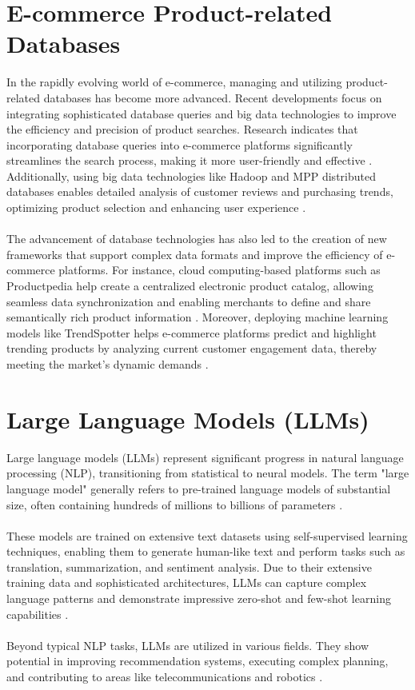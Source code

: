 \section{E-commerce Product-related Databases}
In the rapidly evolving world of e-commerce, managing and utilizing product-related databases has become more advanced. Recent developments focus on integrating sophisticated database queries and big data technologies to improve the efficiency and precision of product searches. Research indicates that incorporating database queries into e-commerce platforms significantly streamlines the search process, making it more user-friendly and effective \cite{Muntjir2016}. Additionally, using big data technologies like Hadoop and MPP distributed databases enables detailed analysis of customer reviews and purchasing trends, optimizing product selection and enhancing user experience \cite{Liang_2020}.
\\\\
The advancement of database technologies has also led to the creation of new frameworks that support complex data formats and improve the efficiency of e-commerce platforms. For instance, cloud computing-based platforms such as Productpedia help create a centralized electronic product catalog, allowing seamless data synchronization and enabling merchants to define and share semantically rich product information \cite{10.1007/978-3-319-20895-4_34}. Moreover, deploying machine learning models like TrendSpotter helps e-commerce platforms predict and highlight trending products by analyzing current customer engagement data, thereby meeting the market's dynamic demands \cite{10.1145/3583780.3615503}.

\section{Large Language Models (LLMs)} %
Large language models (LLMs) represent significant progress in natural language processing (NLP), transitioning from statistical to neural models. The term "large language model" generally refers to pre-trained language models of substantial size, often containing hundreds of millions to billions of parameters \cite{zhao2023survey}.
\\\\
These models are trained on extensive text datasets using self-supervised learning techniques, enabling them to generate human-like text and perform tasks such as translation, summarization, and sentiment analysis. Due to their extensive training data and sophisticated architectures, LLMs can capture complex language patterns and demonstrate impressive zero-shot and few-shot learning capabilities \cite{naveed2024comprehensive}.
\\\\
Beyond typical NLP tasks, LLMs are utilized in various fields. They show potential in improving recommendation systems, executing complex planning, and contributing to areas like telecommunications and robotics \cite{10305960} \cite{fan2023fatellm}.

